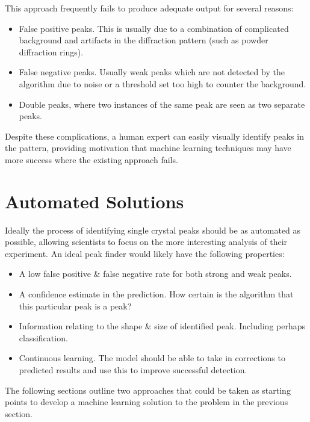 \documentclass[paper=a4, fontsize=8pt]{scrartcl} \usepackage[T1]{fontenc}
\begin{document}
This approach frequently fails to produce adequate output for several reasons:
\begin{itemize}
\item False positive peaks. This is usually due to a combination 
of complicated background and artifacts in the diffraction pattern (such as 
powder diffraction rings).
\item False negative peaks. Usually weak peaks which are not detected by the 
algorithm due to noise or a threshold set too high to counter the background.
\item Double peaks, where two instances of the same peak are seen as two 
separate peaks.
\end{itemize}

Despite these complications, a human expert can easily visually identify peaks
in the pattern, providing motivation that machine learning techniques may have
more success where the existing approach fails.

\section{Automated Solutions} 
Ideally the process of identifying single crystal peaks should be as automated 
as possible, allowing scientists to focus on the more interesting analysis of 
their experiment. An ideal peak finder would likely have the following
properties:

\begin{itemize}
\item A low false positive \& false negative rate for both strong and weak
peaks.
\item A confidence estimate in the prediction. How certain is the algorithm that
this particular peak is a peak?
\item Information relating to the shape \& size of identified peak. Including
perhaps classification.
\item Continuous learning. The model should be able to take in corrections to
predicted results and use this to improve successful detection.
\end{itemize}

The following sections outline two approaches that could be taken as 
starting points to develop a machine learning solution to the problem in the 
previous section.
\end{document}

